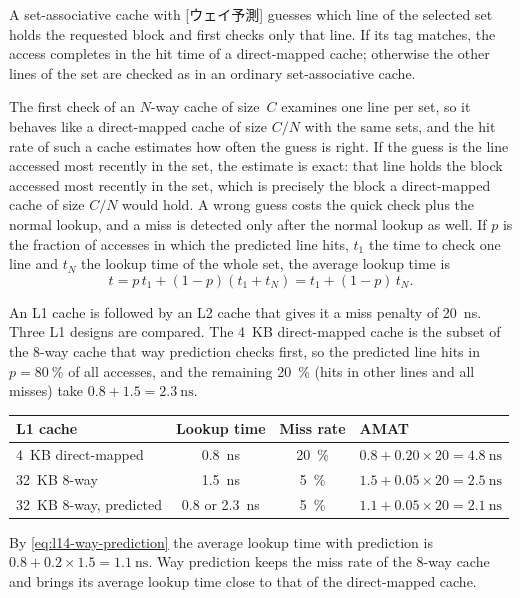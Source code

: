 \documentclass[../main.tex]{subfiles}
\begin{document}
\begin{definition}
  A set-associative cache with [ウェイ予測] guesses
  which line of the selected set holds the requested block and first checks
  only that line.  If its tag
  matches, the access completes in the hit time of a direct-mapped cache;
  otherwise the other lines of the set are checked as in an ordinary
  set-associative cache.
\end{definition}

The first check of an $N$-way cache of size~$C$ examines one line per set,
so it behaves like a direct-mapped cache of size $C/N$ with the same sets,
and the hit rate of such a cache estimates how often the guess is right.  If
the guess is the line accessed most recently in the set, the estimate is
exact: that line holds the block accessed most recently in the set, which is
precisely the block a direct-mapped cache of size $C/N$ would hold.  A wrong
guess costs the quick check plus the normal lookup, and a miss is detected
only after the normal lookup as well.  If $p$ is the fraction of accesses in
which the predicted line hits, $t_1$ the time to check one line and $t_N$ the
lookup time of the whole set, the average lookup time is
\begin{equation}
  t = p\, t_1 + (1-p)(t_1 + t_N) = t_1 + (1-p)\, t_N .
  \label{eq:l14-way-prediction}
\end{equation}

\begin{example}
  \label{ex:l14-way-prediction}
  An L1 cache is followed by an L2 cache that gives it a miss penalty of
  \SI{20}{\nano\second}.  Three L1 designs are compared.  The 4~KB
  direct-mapped cache is the subset of the 8-way cache that way prediction
  checks first, so the predicted line hits in $p = \SI{80}{\percent}$ of all
  accesses, and the remaining \SI{20}{\percent} (hits in other lines and all
  misses) take $0.8 + 1.5 = \SI{2.3}{\nano\second}$.
  \begin{center}\small
    \begin{tabular}{@{}lccl@{}}
      \toprule
      L1 cache & Lookup time & Miss rate & AMAT \\
      \midrule
      4~KB direct-mapped     & \SI{0.8}{\nano\second} & \SI{20}{\percent} & $0.8 + 0.20\times 20 = \SI{4.8}{\nano\second}$ \\
      32~KB 8-way            & \SI{1.5}{\nano\second} & \SI{5}{\percent}  & $1.5 + 0.05\times 20 = \SI{2.5}{\nano\second}$ \\
      32~KB 8-way, predicted & 0.8 or \SI{2.3}{\nano\second} & \SI{5}{\percent} & $1.1 + 0.05\times 20 = \SI{2.1}{\nano\second}$ \\
      \bottomrule
    \end{tabular}
  \end{center}
  By \cref{eq:l14-way-prediction} the average lookup time with prediction is
  $0.8 + 0.2\times 1.5 = \SI{1.1}{\nano\second}$.  Way prediction keeps the
  miss rate of the 8-way cache and brings its average lookup time close to
  that of the direct-mapped cache.
\end{example}
\end{document}
